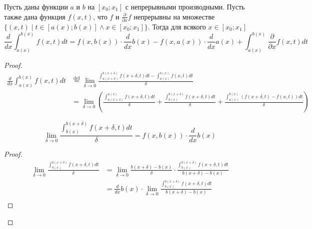 \documentclass[12pt,a4paper]{article}
\newcommand{\eqdef}{\mathbin{\stackrel{\mathrm{def}}{=}}}
\begin{document}
    \begin{theorem}
        Пусть даны функции $a$ и $b$ на $[x_0; x_1]$ с непрерывными производными. Пусть также дана функция $f(x, t)$, что $f$ и $\frac{\partial}{\partial x}f$ непрерывны на множестве $\{(x, t) \mid t \in [a(x); b(x)] \wedge x \in [x_0; x_1]\}$. Тогда для всякого $x \in [x_0; x_1]$
        \[
            \frac{d}{dx} \int_{a(x)}^{b(x)} f(x, t) dt
            = f(x, b(x)) \cdot \frac{d}{dx} b(x)
            - f(x, a(x)) \cdot \frac{d}{dx} a(x)
            + \int_{a(x)}^{b(x)} \frac{\partial}{\partial x} f(x, t) dt
        \]
    \end{theorem}

    \begin{proof}
        \begin{align*}
            \frac{d}{dx} \int_{a(x)}^{b(x)} f(x, t) dt
            &\eqdef \lim_{\delta \to 0} \frac{\int_{a(x + \delta)}^{b(x + \delta)} f(x + \delta, t) dt - \int_{a(x)}^{b(x)} f(x, t) dt}{\delta}\\
            &= \lim_{\delta \to 0} \left(
                \frac{\int_{a(x + \delta)}^{a(x)} f(x + \delta, t) dt}{\delta}
                + \frac{\int_{b(x)}^{b(x + \delta)} f(x + \delta, t) dt}{\delta}
                + \frac{\int_{a(x)}^{b(x)} (f(x + \delta, t) - f(x, t)) dt}{\delta}
            \right)
        \end{align*}
        
        \begin{thlemma}
            \[\lim_{\delta \to 0} \frac{\int_{b(x)}^{b(x + \delta)} f(x + \delta, t) dt}{\delta} = f(x, b(x)) \cdot \frac{d}{dx} b(x)\]
        \end{thlemma}

        \begin{proof}
            \begin{align*}
                \lim_{\delta \to 0} \frac{\int_{b(x)}^{b(x + \delta)} f(x + \delta, t) dt}{\delta}
                &= \lim_{\delta \to 0} \frac{b(x + \delta) - b(x)}{\delta} \cdot \frac{\int_{b(x)}^{b(x + \delta)} f(x + \delta, t) dt}{b(x + \delta) - b(x)}\\
                &= \frac{d}{dx} b(x) \cdot \lim_{\delta \to 0} \frac{\int_{b(x)}^{b(x + \delta)} f(x + \delta, t) dt}{b(x + \delta) - b(x)}\\
            \end{align*}


\end{proof}
\end{proof}
\end{document}
